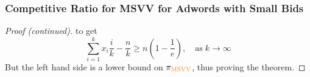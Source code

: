 \begin{frame}
    \frametitle{Competitive Ratio for MSVV for Adwords with Small Bids}
    \begin{proof}[Proof (continued)]
        to get
        \begin{equation*}
            \sum_{i=1}^k x_i \frac{i}{k} - \frac{n}{k} \geq n \left(1 - \frac{1}{e} \right), \quad \text{as} \; k \to \infty
        \end{equation*}
        But the left hand side is a lower bound on $\pi_{\text{\textcolor{orange}{MSVV}}}$, thus proving the theorem.
    \end{proof}
\end{frame}